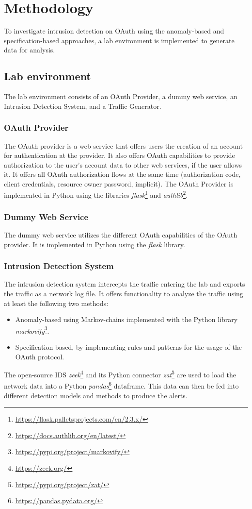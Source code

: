 \documentclass{article}
\begin{document}
\section{Methodology}
To investigate intrusion detection on OAuth using the anomaly-based and specification-based approaches, a lab environment is implemented to generate data for analysis.

\subsection{Lab environment}
The lab environment consists of an OAuth Provider, a dummy web service, an Intrusion Detection System, and a Traffic Generator.

\subsubsection{OAuth Provider}
The OAuth provider is a web service that offers users the creation of an account for authentication at the provider. It also offers OAuth capabilities to provide authorization to the user's account data to other web services, if the user allows it. It offers all OAuth authorization flows at the same time (authorization code, client credentials, resource owner password, implicit). The OAuth Provider is implemented in Python using the libraries \emph{flask}\footnote{\url{https://flask.palletsprojects.com/en/2.3.x/}} and \emph{authlib}\footnote{\url{https://docs.authlib.org/en/latest/}}.

\subsubsection{Dummy Web Service}
The dummy web service utilizes the different OAuth capabilities of the OAuth provider. It is implemented in Python using the \emph{flask} library.

\subsubsection{Intrusion Detection System}
The intrusion detection system intercepts the traffic entering the lab and exports the traffic as a network log file. It offers functionality to analyze the traffic using at least the following two methods:

\begin{itemize}
    \item Anomaly-based using Markov-chains implemented with the Python library \emph{markovify}\footnote{\url{https://pypi.org/project/markovify/}}.
    \item Specification-based, by implementing rules and patterns for the usage of the OAuth protocol.
\end{itemize}
The open-source IDS \emph{zeek}\footnote{\url{https://zeek.org/}} and its Python connector \emph{zat}\footnote{\url{https://pypi.org/project/zat/}} are used to load the network data into a Python \emph{pandas}\footnote{\url{https://pandas.pydata.org/}} dataframe. This data can then be fed into different detection models and methods to produce the alerts.
\end{document}

